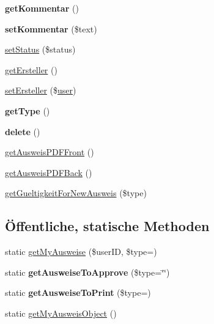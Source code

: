 \begin{DoxyCompactItemize}
\item 
\mbox{\label{class_abstract_ausweis_a3c8db4e05eda2c9e69f394d1b479446c}} 
{\bfseries get\+Kommentar} ()
\item 
\mbox{\label{class_abstract_ausweis_aca8f3a0201695da62a1dc6a178ecf06a}} 
{\bfseries set\+Kommentar} (\$text)
\item 
\mbox{\hyperlink{class_abstract_ausweis_a361fa87f9b9b47c4e9985e80857e8b49}{set\+Status}} (\$status)
\item 
\mbox{\hyperlink{class_abstract_ausweis_adb047c042d27a59c3e019ea7749c0465}{get\+Ersteller}} ()
\item 
\mbox{\hyperlink{class_abstract_ausweis_a83fd93f15ff8af50519bcb45bae2afdb}{set\+Ersteller}} (\$\mbox{\hyperlink{classuser}{user}})
\item 
\mbox{\label{class_abstract_ausweis_a7c23003564fbc03bfce7ab567a1fa5e6}} 
{\bfseries get\+Type} ()
\item 
\mbox{\label{class_abstract_ausweis_a7e5a85e9962fd0098a7aa99cf2ba3129}} 
{\bfseries delete} ()
\item 
\mbox{\hyperlink{class_abstract_ausweis_a7c65e02f1291567ab17484537a8fb2fe}{get\+Ausweis\+P\+D\+F\+Front}} ()
\item 
\mbox{\hyperlink{class_abstract_ausweis_abc559bd235762d0234c25dcea44a8730}{get\+Ausweis\+P\+D\+F\+Back}} ()
\item 
\mbox{\hyperlink{class_abstract_ausweis_a3fdf082a0932510420d85a3c3932eeeb}{get\+Gueltigkeit\+For\+New\+Ausweis}} (\$type)
\end{DoxyCompactItemize}
\subsection*{Öffentliche, statische Methoden}
\begin{DoxyCompactItemize}
\item 
static \mbox{\hyperlink{class_abstract_ausweis_a05eb44a25eb180ca23d6d8ed0ec35312}{get\+My\+Ausweise}} (\$user\+ID, \$type=\textquotesingle{}\textquotesingle{})
\item 
\mbox{\label{class_abstract_ausweis_a668fbe04fcf81d856394d7dd18bb2aed}} 
static {\bfseries get\+Ausweise\+To\+Approve} (\$type=\char`\"{}\char`\"{})
\item 
\mbox{\label{class_abstract_ausweis_a8ff5b30f8de55f75f6c93f07b8c63347}} 
static {\bfseries get\+Ausweise\+To\+Print} (\$type=\textquotesingle{}\textquotesingle{})
\item 
static \mbox{\hyperlink{class_abstract_ausweis_ad67c716ff2729d54743fecdfcc0008ce}{get\+My\+Ausweis\+Object}} ()
\end{DoxyCompactItemize}



